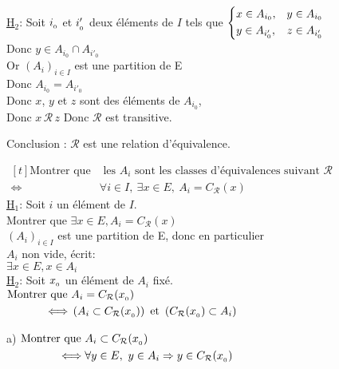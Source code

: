 \documentclass[12pt,twoside,a4paper]{article}
\begin{document}
\begin{preuve}
\begin{liste}
\begin{liste}
						\underline{H$_2$}: Soit $i_{_{0}}$ et $i'_{_{0}}$ deux \'el\'ements de $I$ tels que $\left\{\begin{aligned}& x\in A_{i_0},& y\in A_{i_0}\\& y\in A_{i'_0},& z\in A_{i'_0}\end{aligned}\right.$\\
						Donc $y\in A_{i_0}\cap A_{i'_0}$\\
						Or $(A_i)_{i\in I}$ est une partition de E\\
						Donc $A_{i_0}=A_{i'_0}$\\
						Donc $x$, $y$ et $z$ sont des \'el\'ements de $A_{i_0}$,\\
						Donc $x\,\mathcal{R}\,z$
						Donc $\mathcal{R}$ est transitive.
				\end{liste}
				Conclusion : $\mathcal{R}$ est une relation d'\'equivalence.\\
				\item[\cercle{2}]$\begin{aligned}[t]\text{Montrer que}&\text{ les } A_i\text{ sont les classes d'\'equivalences suivant }\mathcal{R}\\
					\iff& \forall i\in I,\ \exists x\in E,\ A_i=C_\mathcal{R}(x)\end{aligned}$\\
					\underline{H$_1$}: Soit $i$ un \'el\'ement de $I$.\\
					Montrer que $\exists x\in E, A_i=C_\mathcal{R}(x)$\\
					$(A_i)_{i\in I}$ est une partition de E, donc en particulier\\
					$A_i$ non vide, \'ecrit:\\
					$\exists x\in E, x\in A_i$\\
					\underline{H$_2$}: Soit $x_{_{0}}$ un \'el\'ement de $A_i$ fix\'e.\\
					$\begin{aligned}[t]\text{Montrer que }& A_i=C_\mathcal{R}(x_{_{0}})\\
					\iff& \left(A_i\subset C_\mathcal{R}(x_{_{0}})\right)\text{ et }\left(C_\mathcal{R}(x_{_{0}})\subset A_i\right)\end{aligned}$\\
					\begin{liste}
						\item[a)] $\begin{aligned}[t]\text{Montrer que }& A_i\subset C_\mathcal{R}(x_{_{0}})\\
							\iff& \forall y\in E,\ y\in A_i\Rightarrow y\in C_\mathcal{R}(x_{_{0}})\end{aligned}$\\

\end{liste}
\end{liste}
\end{preuve}
\end{document}
